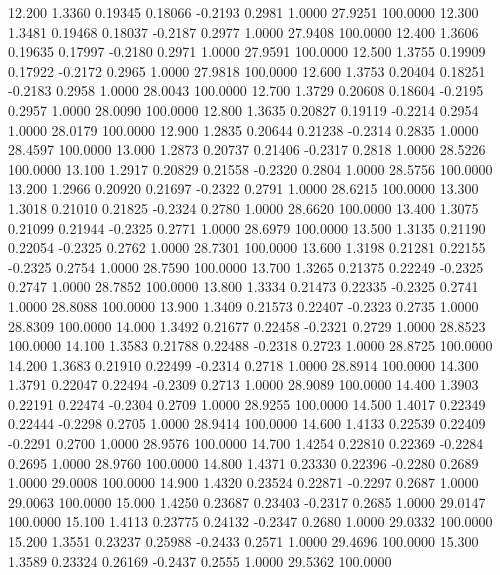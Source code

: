   12.200   1.3360   0.19345   0.18066  -0.2193   0.2981   1.0000  27.9251 100.0000
  12.300   1.3481   0.19468   0.18037  -0.2187   0.2977   1.0000  27.9408 100.0000
  12.400   1.3606   0.19635   0.17997  -0.2180   0.2971   1.0000  27.9591 100.0000
  12.500   1.3755   0.19909   0.17922  -0.2172   0.2965   1.0000  27.9818 100.0000
  12.600   1.3753   0.20404   0.18251  -0.2183   0.2958   1.0000  28.0043 100.0000
  12.700   1.3729   0.20608   0.18604  -0.2195   0.2957   1.0000  28.0090 100.0000
  12.800   1.3635   0.20827   0.19119  -0.2214   0.2954   1.0000  28.0179 100.0000
  12.900   1.2835   0.20644   0.21238  -0.2314   0.2835   1.0000  28.4597 100.0000
  13.000   1.2873   0.20737   0.21406  -0.2317   0.2818   1.0000  28.5226 100.0000
  13.100   1.2917   0.20829   0.21558  -0.2320   0.2804   1.0000  28.5756 100.0000
  13.200   1.2966   0.20920   0.21697  -0.2322   0.2791   1.0000  28.6215 100.0000
  13.300   1.3018   0.21010   0.21825  -0.2324   0.2780   1.0000  28.6620 100.0000
  13.400   1.3075   0.21099   0.21944  -0.2325   0.2771   1.0000  28.6979 100.0000
  13.500   1.3135   0.21190   0.22054  -0.2325   0.2762   1.0000  28.7301 100.0000
  13.600   1.3198   0.21281   0.22155  -0.2325   0.2754   1.0000  28.7590 100.0000
  13.700   1.3265   0.21375   0.22249  -0.2325   0.2747   1.0000  28.7852 100.0000
  13.800   1.3334   0.21473   0.22335  -0.2325   0.2741   1.0000  28.8088 100.0000
  13.900   1.3409   0.21573   0.22407  -0.2323   0.2735   1.0000  28.8309 100.0000
  14.000   1.3492   0.21677   0.22458  -0.2321   0.2729   1.0000  28.8523 100.0000
  14.100   1.3583   0.21788   0.22488  -0.2318   0.2723   1.0000  28.8725 100.0000
  14.200   1.3683   0.21910   0.22499  -0.2314   0.2718   1.0000  28.8914 100.0000
  14.300   1.3791   0.22047   0.22494  -0.2309   0.2713   1.0000  28.9089 100.0000
  14.400   1.3903   0.22191   0.22474  -0.2304   0.2709   1.0000  28.9255 100.0000
  14.500   1.4017   0.22349   0.22444  -0.2298   0.2705   1.0000  28.9414 100.0000
  14.600   1.4133   0.22539   0.22409  -0.2291   0.2700   1.0000  28.9576 100.0000
  14.700   1.4254   0.22810   0.22369  -0.2284   0.2695   1.0000  28.9760 100.0000
  14.800   1.4371   0.23330   0.22396  -0.2280   0.2689   1.0000  29.0008 100.0000
  14.900   1.4320   0.23524   0.22871  -0.2297   0.2687   1.0000  29.0063 100.0000
  15.000   1.4250   0.23687   0.23403  -0.2317   0.2685   1.0000  29.0147 100.0000
  15.100   1.4113   0.23775   0.24132  -0.2347   0.2680   1.0000  29.0332 100.0000
  15.200   1.3551   0.23237   0.25988  -0.2433   0.2571   1.0000  29.4696 100.0000
  15.300   1.3589   0.23324   0.26169  -0.2437   0.2555   1.0000  29.5362 100.0000
